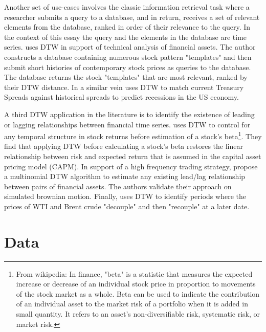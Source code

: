 \documentclass[12pt]{report}
\begin{document}
Another set of use-cases involves the classic information retrieval task where a researcher submits a query to a database, and in return, receives a set of relevant elements from the database, ranked in order of their relevance to the query. In the context of this essay the query and the elements in the database are time series. \cite{WAN2017151} uses DTW in support of technical analysis of financial assets. The author constructs a database containing numerous stock pattern "templates" and then submit short histories of contemporary stock prices as queries to the database. The database returns the stock "templates" that are most relevant, ranked by their DTW distance. In a similar vein \cite{Raihan2017} uses DTW to match current Treasury Spreads against historical spreads to predict recessions in the US economy.

A third DTW application in the literature is to identify the existence of leading or lagging relationships between financial time series. \cite{HowardTalisAlexeev_2020} uses DTW to control for any temporal structure in stock returns before estimation of a stock's beta\footnote{From wikipedia: In finance, "beta" is a statistic that measures the expected increase or decrease of an individual stock price in proportion to movements of the stock market as a whole. Beta can be used to indicate the contribution of an individual asset to the market risk of a portfolio when it is added in small quantity. It refers to an asset's non-diversifiable risk, systematic risk, or market risk.}. They find that applying DTW before calculating a stock's beta restores the linear relationship between risk and expected return that is assumed in the capital asset pricing model (CAPM). In support of a high frequency trading strategy, \cite{Ito_Sakemoto_2020} propose a multinomial DTW algorithm to estimate any existing lead/lag relationship between pairs of financial assets. The authors validate their approach on simulated brownian motion. Finally, \cite{Mastroeni_et_al_2021} uses DTW to identify periods where the prices of WTI and Brent crude "decouple" and then "recouple" at a later date.

\section{Data}
\end{document}
